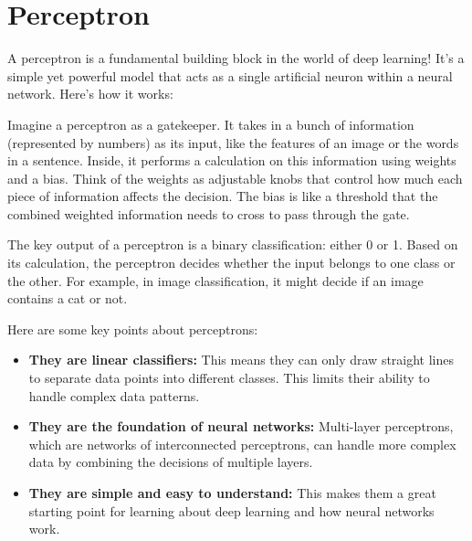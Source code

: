 \section{Perceptron}

A perceptron is a fundamental building block in the world of deep learning! It's a simple yet powerful model that acts as a single artificial neuron within a neural network. Here's how it works:

Imagine a perceptron as a gatekeeper. It takes in a bunch of information (represented by numbers) as its input, like the features of an image or the words in a sentence. Inside, it performs a calculation on this information using weights and a bias. Think of the weights as adjustable knobs that control how much each piece of information affects the decision. The bias is like a threshold that the combined weighted information needs to cross to pass through the gate.

The key output of a perceptron is a binary classification: either 0 or 1. Based on its calculation, the perceptron decides whether the input belongs to one class or the other. For example, in image classification, it might decide if an image contains a cat or not.

Here are some key points about perceptrons:
    \begin{itemize}
        \item \textbf{They are linear classifiers:} This means they can only draw straight lines to separate data points into different classes. This limits their ability to handle complex data patterns.
        \item \textbf{They are the foundation of neural networks:} Multi-layer perceptrons, which are networks of interconnected perceptrons, can handle more complex data by combining the decisions of multiple layers.
        \item \textbf{They are simple and easy to understand:} This makes them a great starting point for learning about deep learning and how neural networks work.
    \end{itemize}

